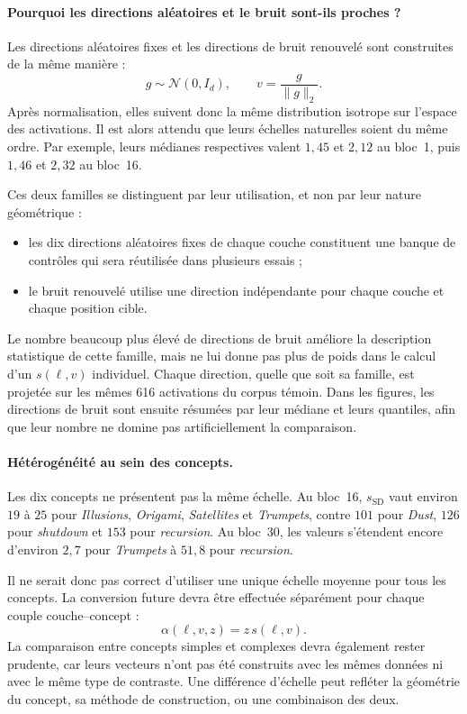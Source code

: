 \documentclass[a4paper,10pt]{article}
\begin{document}
\paragraph{Pourquoi les directions aléatoires et le bruit sont-ils proches ?}

Les directions aléatoires fixes et les directions de bruit renouvelé sont
construites de la même manière :
\[
g\sim\mathcal N(0,I_d),
\qquad
v=\frac{g}{\lVert g\rVert_2}.
\]
Après normalisation, elles suivent donc la même distribution isotrope sur
l'espace des activations. Il est alors attendu que leurs échelles naturelles
soient du même ordre. Par exemple, leurs médianes respectives valent $1{,}45$
et $2{,}12$ au bloc~1, puis $1{,}46$ et $2{,}32$ au bloc~16.

Ces deux familles se distinguent par leur utilisation, et non par leur nature
géométrique :

\begin{itemize}
  \item les dix directions aléatoires fixes de chaque couche constituent une
        banque de contrôles qui sera réutilisée dans plusieurs essais ;
  \item le bruit renouvelé utilise une direction indépendante pour chaque
        couche et chaque position cible.
\end{itemize}

Le nombre beaucoup plus élevé de directions de bruit améliore la description
statistique de cette famille, mais ne lui donne pas plus de poids dans le calcul
d'un $s(\ell,v)$ individuel. Chaque direction, quelle que soit sa famille, est
projetée sur les mêmes 616 activations du corpus témoin. Dans les figures, les
directions de bruit sont ensuite résumées par leur médiane et leurs quantiles,
afin que leur nombre ne domine pas artificiellement la comparaison.

\paragraph{Hétérogénéité au sein des concepts.}

Les dix concepts ne présentent pas la même échelle. Au bloc~16,
$s_{\mathrm{SD}}$ vaut environ $19$ à $25$ pour \emph{Illusions},
\emph{Origami}, \emph{Satellites} et \emph{Trumpets}, contre $101$ pour
\emph{Dust}, $126$ pour \emph{shutdown} et $153$ pour \emph{recursion}. Au
bloc~30, les valeurs s'étendent encore d'environ $2{,}7$ pour
\emph{Trumpets} à $51{,}8$ pour \emph{recursion}.

Il ne serait donc pas correct d'utiliser une unique échelle moyenne pour tous
les concepts. La conversion future devra être effectuée séparément pour chaque
couple couche--concept :
\[
\alpha(\ell,v,z)=z\,s(\ell,v).
\]
La comparaison entre concepts simples et complexes devra également rester
prudente, car leurs vecteurs n'ont pas été construits avec les mêmes données ni
avec le même type de contraste. Une différence d'échelle peut refléter la
géométrie du concept, sa méthode de construction, ou une combinaison des deux.
\end{document}
